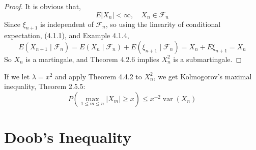 \begin{proof}
    It is obvious that,
    \begin{equation*}
        E\left|X_{n}\right|<\infty,\quad X_{n}\in\mathcal{F}_{n}
    \end{equation*}
    Since $\xi_{n+1}$ is independent of $\mathcal{F}_{n}$, so using the linearity of conditional expectation, (4.1.1), and Example 4.1.4,
    \begin{equation*}
        E\left(X_{n+1}\mid\mathcal{F}_{n}\right)=E\left(X_{n}\mid\mathcal{F}_{n}\right)+E\left(\xi_{n+1}\mid\mathcal{F}_{n}\right)=X_{n}+E\xi_{n+1}=X_{n}
    \end{equation*}
    So $X_{n}$ is a martingale, and Theorem 4.2.6 implies $X_{n}^{2}$ is a submartingale.
\end{proof}

\begin{remark}
    If we let $\lambda=x^{2}$ and apply Theorem 4.4.2 to $X_{n}^{2}$, we get Kolmogorov's maximal inequality, Theorem 2.5.5:
    \begin{equation}
        P\left(\max_{1\leq m\leq n}\left|X_{m}\right|\geq x\right)\leq x^{-2}\operatorname{var}\left(X_{n}\right)
    \end{equation}
\end{remark}

\begin{theorem}
    
\end{theorem}

\begin{theorem}
    
\end{theorem}

\begin{definition}
    
\end{definition}

\begin{definition}
    
\end{definition}

\begin{theorem}
    
\end{theorem}

\section{Doob's Inequality}

